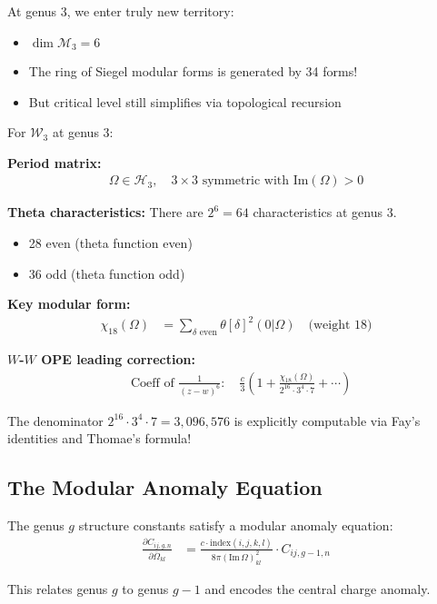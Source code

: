 \begin{remark}
At genus 3, we enter truly new territory:
\begin{itemize}
\item $\dim \mathcal{M}_3 = 6$
\item The ring of Siegel modular forms is generated by 34 forms!
\item But critical level still simplifies via topological recursion
\end{itemize}
\end{remark}

\begin{example}
For $\mathcal{W}_3$ at genus 3:

\textbf{Period matrix:}
\begin{align}
\Omega \in \mathcal{H}_3, \quad 3 \times 3 \text{ symmetric with } \text{Im}(\Omega) > 0
\end{align}

\textbf{Theta characteristics:} There are $2^6 = 64$ characteristics at genus 3.
\begin{itemize}
\item 28 even (theta function even)
\item 36 odd (theta function odd)
\end{itemize}

\textbf{Key modular form:}
\begin{align}
\chi_{18}(\Omega) &= \sum_{\delta \text{ even}} \theta[\delta]^2(0|\Omega) \quad \text{(weight 18)}
\end{align}

\textbf{$W$-$W$ OPE leading correction:}
\begin{align}
&\text{Coeff of } \frac{1}{(z-w)^6}: \quad \frac{c}{3}\left(1 + \frac{\chi_{18}(\Omega)}{2^{16} \cdot 3^4 \cdot 7} + \cdots\right)
\end{align}

The denominator $2^{16} \cdot 3^4 \cdot 7 = 3,096,576$ is explicitly computable via 
Fay's identities and Thomae's formula!
\end{example}

\subsection{The Modular Anomaly Equation}

\begin{theorem}
The genus $g$ structure constants satisfy a modular anomaly equation:
\begin{align}
\frac{\partial C_{ij,g,n}}{\partial \bar{\Omega}_{kl}} &= \frac{c \cdot \text{index}(i,j,k,l)}{8\pi (\text{Im}\,\Omega)_{kl}^2} \cdot C_{ij,g-1,n}
\end{align}

This relates genus $g$ to genus $g-1$ and encodes the central charge anomaly.
\end{theorem}

